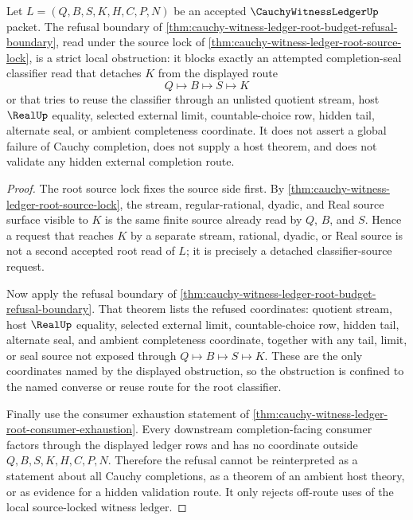 \begin{corollary}
\label{cor:cauchy-witness-ledger-root-source-lock-strict-obstruction}
Let $L=(Q,B,S,K,H,C,P,N)$ be an accepted $\CauchyWitnessLedgerUp$ packet. The refusal boundary of \autoref{thm:cauchy-witness-ledger-root-budget-refusal-boundary}, read under the source lock of \autoref{thm:cauchy-witness-ledger-root-source-lock}, is a strict local obstruction: it blocks exactly an attempted completion-seal classifier read that detaches $K$ from the displayed route
$$
Q \longmapsto B \longmapsto S \longmapsto K
$$
or that tries to reuse the classifier through an unlisted quotient stream, host $\RealUp$ equality, selected external limit, countable-choice row, hidden tail, alternate seal, or ambient completeness coordinate. It does not assert a global failure of Cauchy completion, does not supply a host theorem, and does not validate any hidden external completion route.
\end{corollary}
\begin{proof}
The root source lock fixes the source side first. By \autoref{thm:cauchy-witness-ledger-root-source-lock}, the stream, regular-rational, dyadic, and Real source surface visible to $K$ is the same finite source already read by $Q$, $B$, and $S$. Hence a request that reaches $K$ by a separate stream, rational, dyadic, or Real source is not a second accepted root read of $L$; it is precisely a detached classifier-source request.

Now apply the refusal boundary of \autoref{thm:cauchy-witness-ledger-root-budget-refusal-boundary}. That theorem lists the refused coordinates: quotient stream, host $\RealUp$ equality, selected external limit, countable-choice row, hidden tail, alternate seal, and ambient completeness coordinate, together with any tail, limit, or seal source not exposed through $Q \longmapsto B \longmapsto S \longmapsto K$. These are the only coordinates named by the displayed obstruction, so the obstruction is confined to the named converse or reuse route for the root classifier.

Finally use the consumer exhaustion statement of \autoref{thm:cauchy-witness-ledger-root-consumer-exhaustion}. Every downstream completion-facing consumer factors through the displayed ledger rows and has no coordinate outside $Q,B,S,K,H,C,P,N$. Therefore the refusal cannot be reinterpreted as a statement about all Cauchy completions, as a theorem of an ambient host theory, or as evidence for a hidden validation route. It only rejects off-route uses of the local source-locked witness ledger.
\end{proof}
